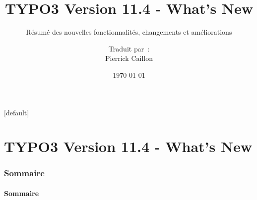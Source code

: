 \documentclass[t]{beamer}
\title{TYPO3 Version 11.4 - What's New}
\subtitle{Résumé des nouvelles fonctionnalités, changements et améliorations}
\author{
	\centerline{Traduit par~:}
	\centerline{Pierrick Caillon}
}
\date{\today}
\begin{document}
\sharefont


\begingroup
	[default]
	\begin{frame}
		\titlepage
	\end{frame}
\endgroup


\section*{TYPO3 Version 11.4 - What's New}
\begin{frame}[fragile]
	\frametitle{Sommaire}
	\framesubtitle{Sommaire}

	\tableofcontents

\end{frame}






















\end{document}
